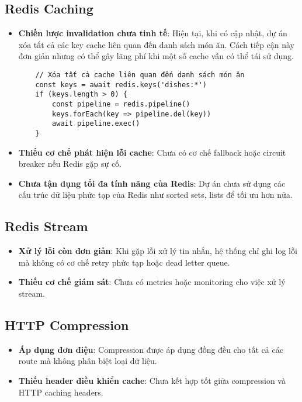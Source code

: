 \subsection{Redis Caching}
\begin{itemize}
    \item \textbf{Chiến lược invalidation chưa tinh tế}: Hiện tại, khi có cập nhật, dự án xóa tất cả các key cache liên quan đến danh sách món ăn. Cách tiếp cận này đơn giản nhưng có thể gây lãng phí khi một số cache vẫn có thể tái sử dụng.
    \begin{verbatim}
    // Xóa tất cả cache liên quan đến danh sách món ăn
    const keys = await redis.keys('dishes:*')
    if (keys.length > 0) {
        const pipeline = redis.pipeline()
        keys.forEach(key => pipeline.del(key))
        await pipeline.exec()
    }
    \end{verbatim}
    \item \textbf{Thiếu cơ chế phát hiện lỗi cache}: Chưa có cơ chế fallback hoặc circuit breaker nếu Redis gặp sự cố.
    \item \textbf{Chưa tận dụng tối đa tính năng của Redis}: Dự án chưa sử dụng các cấu trúc dữ liệu phức tạp của Redis như sorted sets, lists để tối ưu hơn nữa.
\end{itemize}

\subsection{Redis Stream}
\begin{itemize}
    \item \textbf{Xử lý lỗi còn đơn giản}: Khi gặp lỗi xử lý tin nhắn, hệ thống chỉ ghi log lỗi mà không có cơ chế retry phức tạp hoặc dead letter queue.
    \item \textbf{Thiếu cơ chế giám sát}: Chưa có metrics hoặc monitoring cho việc xử lý stream.
\end{itemize}

\subsection{HTTP Compression}
\begin{itemize}
    \item \textbf{Áp dụng đơn điệu}: Compression được áp dụng đồng đều cho tất cả các route mà không phân biệt loại dữ liệu.
    \item \textbf{Thiếu header điều khiển cache}: Chưa kết hợp tốt giữa compression và HTTP caching headers.
\end{itemize}

